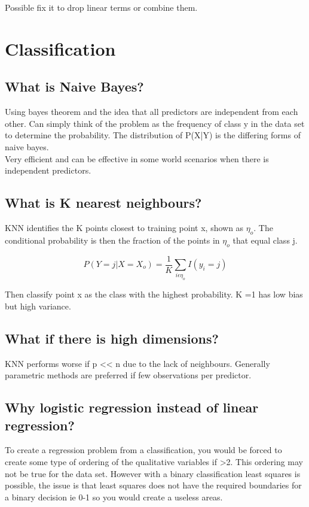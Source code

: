 \documentclass[11pt]{scrartcl} %
\begin{document}
Possible fix it to drop linear terms or combine them.

\section{Classification}

\subsection{What is Naive Bayes?}

Using bayes theorem and the idea that all predictors are independent from each other.
Can simply think of the problem as the frequency of class y in the data set to determine the
probability. The distribution of P(X|Y) is the differing forms of naive bayes.\\

Very efficient and can be effective in some world scenarios when there is independent predictors.

\subsection{What is K nearest neighbours?}

KNN identifies the K points closest to training point x, shown as \(\eta_o\). The conditional probability is then
the fraction of the points in \(\eta_o\) that equal class j.

\begin{equation}
	P(Y=j|X=X_o) = \frac{1}{K}\sum_{i\epsilon \eta_o}{I(y_i=j)}
\end{equation}

Then classify point x as the class with the highest probability. K =1 has low bias but high variance.

\subsection{What if there is high dimensions?}

KNN performs worse if p << n due to the lack of neighbours. Generally parametric methods are preferred if
few observations per predictor.

\subsection{Why logistic regression instead of linear regression?}

To create a regression problem from a classification, you would be forced to create some type of ordering of the qualitative
variables if >2. This ordering may not be true for the data set. However with a binary classification least squares is possible, the
issue is that least squares does not have the required boundaries for a binary decision ie 0-1 so you would create a useless areas.
\end{document}
